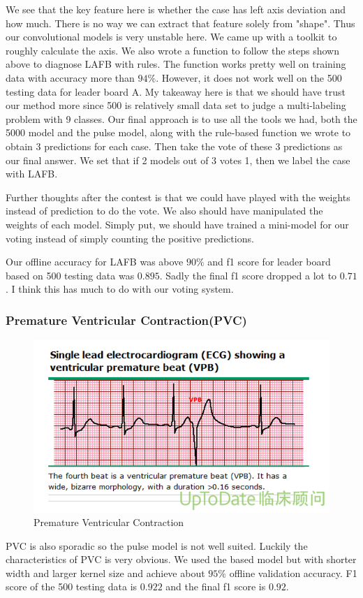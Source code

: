 \documentclass[runningheads]{llncs}
\begin{document}
We see that the key feature here is whether the case has left axis deviation and how much. There is no way we can extract that feature solely from "shape". Thus our convolutional models is very unstable here. We came up with a toolkit to roughly calculate the axis. We also wrote a function to follow the steps shown above to diagnose LAFB with rules. The function works pretty well on training data with accuracy more than $94\%$. However, it does not work well on the 500 testing data for leader board A. My takeaway here is that we should have trust our method more since 500 is relatively small data set to judge a multi-labeling problem with 9 classes. Our final approach is to use all the tools we had, both the 5000 model and the pulse model, along with the rule-based function we wrote to obtain 3 predictions for each case. Then take the vote of these 3 predictions as our final answer. We set that if 2 models out of 3 votes 1, then we label the case with LAFB. 

Further thoughts after the contest is that we could have played with the weights instead of prediction to do the vote. We also should have manipulated the weights of each model. Simply put, we should have trained a mini-model for our voting instead of simply counting the positive predictions. 

Our offline accuracy for LAFB was above $90\%$ and f1 score for leader board based on 500 testing data was $0.895$. Sadly the final f1 score dropped a lot to $0.71$. I think this has much to do with our voting system. 

\subsubsection{Premature Ventricular Contraction(PVC)}
\begin{figure}[H]
	\includegraphics[width=\linewidth]{img/PVC.png}
	\caption{\label{fig:PVC} Premature Ventricular Contraction \cite{UptoDate}}
\end{figure}
PVC is also sporadic so the pulse model is not well suited. Luckily the characteristics of PVC is very obvious. We used the based model but with shorter width and larger kernel size and achieve about $95\%$ offline validation accuracy. F1 score of the 500 testing data is $0.922$ and the final f1 score is $0.92$.
\end{document}
